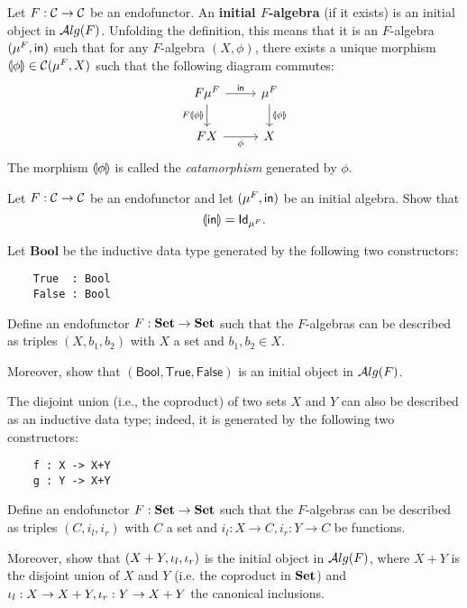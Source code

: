 \begin{dfn}\label{dfn:initial-alg}
  Let $F:\CC\to\CC$ be an endofunctor. An \textbf{initial $F$-algebra} (if it exists) is an initial object in $\ALG{F}$.
  Unfolding the definition, this means that it is an $F$-algebra $(\Initalg{F}, \In)$ such that for any $F$-algebra $(X,\phi)$, there exists a unique morphism $\catam{\phi} \in \CHom{\CC}{\Initalg{F}}{X}$ such that the following diagram commutes:
\begin{equation}\label{eq:initial-f-alg}
\begin{tikzcd}
{F\Initalg{F}} 
\arrow[r, "\In"] 
\arrow[d,swap, "F\catam{\phi}"]
& {\Initalg{F}} 
\arrow[d, "\catam{\phi}"] 
\\
FX
\arrow[r, swap, "\phi"] 
& X
\end{tikzcd}
\end{equation}
The morphism $\catam{\phi}$ is called the \emph{catamorphism} generated by $\phi$.
\end{dfn}

\begin{exer}\label{exer:in_catamorphism_id}
  Let $F:\CC\to\CC$ be an endofunctor and let $(\Initalg F, \In)$ be an initial algebra.
  Show that
  \[\catam{\In} = \Id[\Initalg{F}].\]
\end{exer}

\begin{exer}\label{exer:bool_as_initial_algebra}
  Let $\mathbf{Bool}$ be the inductive data type generated by the following two constructors:
\begin{lstlisting}
    True  : Bool
    False : Bool
\end{lstlisting}
  Define an endofunctor $F:\SET\to \SET$ such that the $F$-algebras can be described as triples $(X, b_1, b_2)$ with $X$ a set and $b_1,b_2\in X$.
  
  Moreover, show that $(\mathsf{Bool}, \mathsf{True}, \mathsf{False})$ is an initial object in $\ALG{F}$.
\end{exer}

\begin{exer}\label{exer:coproduct_as_initial_algebra}
  The disjoint union (i.e., the coproduct) of two sets $X$ and $Y$ can also be described as an inductive data type; indeed, it is generated by the following two constructors:
\begin{lstlisting}
    f : X -> X+Y
    g : Y -> X+Y
\end{lstlisting}
  Define an endofunctor $F:\SET\to \SET$ such that the $F$-algebras can be described as triples $(C, i_l, i_r)$ with $C$ a set and $i_l : X\to C, i_r : Y\to C$ be functions.
 
  Moreover, show that $(X + Y, \inl, \inr)$ is the initial object in $\ALG{F}$, where $X+Y$ is the disjoint union of $X$ and $Y$ (i.e. the coproduct in $\SET$) and $\inl:X\to X+Y, \inr:Y\to X+Y$ the canonical inclusions.
\end{exer}

